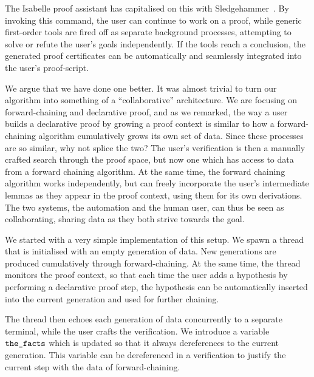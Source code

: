 The Isabelle proof assistant has capitalised on this with Sledgehammer~\cite{IsabelleSledgehammer}. By invoking this command, the user can continue to work on a proof, while generic first-order tools are fired off as separate background processes, attempting to solve or refute the user's goals independently. If the tools reach a conclusion, the generated proof certificates can be automatically and seamlessly integrated into the user's proof-script. 

We argue that we have done one better. It was almost trivial to turn our algorithm into something of a ``collaborative'' architecture. We are focusing on forward-chaining and declarative proof, and as we remarked, the way a user builds a declarative proof by growing a proof context is similar to how a forward-chaining algorithm cumulatively grows its own set of data. Since these processes are so similar, why not splice the two? The user's verification is then a manually crafted search through the proof space, but now one which has access to data from a forward chaining algorithm. At the same time, the forward chaining algorithm works independently, but can freely incorporate the user's intermediate lemmas as they appear in the proof context, using them for its own derivations. The two systems, the automation and the human user, can thus be seen as collaborating, sharing data as they both strive towards the goal. 

We started with a very simple implementation of this setup. We spawn a thread that is initialised with an empty generation of data. New generations are produced cumulatively through forward-chaining. At the same time, the thread monitors the proof context, so that each time the user adds a hypothesis by performing a declarative proof step, the hypothesis can be automatically inserted into the current generation and used for further chaining.

The thread then echoes each generation of data concurrently to a separate terminal, while the user crafts the verification. We introduce a variable $\texttt{the\_facts}$ which is updated so that it always dereferences to the current generation. This variable can be dereferenced in a verification to justify the current step with the data of forward-chaining. 


